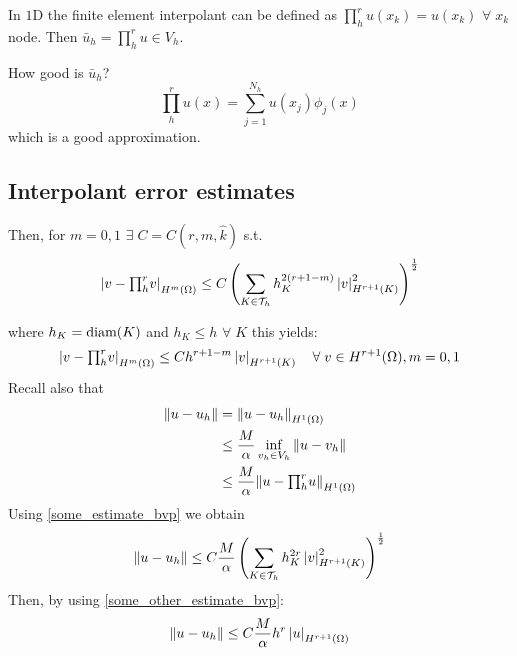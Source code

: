 In \(1\)D the finite element interpolant can be defined as \(\prod_{h}^{r} u(x_k) = u(x_k)\) \(\forall \; x_k\) node. Then \(\bar{u}_h = \prod_{h}^r u \in V_h\). 

How good is \(\bar{u}_h\)? 
\[
    \prod_{h}^{r} u(x) = \sum_{j=1}^{N_h} u(x_j)\phi_j(x)
\]
which is a good approximation.
\subsection*{Interpolant error estimates}
Then, for \(m=0,1\) \(\exists \; C = C(r,m,\hat{k})\) s.t.
\begin{equation}
    \left\lvert v-{\textstyle\prod_{h}^{r}}v\right\rvert_{H^m(\Omega)} \leq C\left(\sum_{K \in \mathcal{T}_h}h_K^{2(r+1-m)}\left\lvert v\right\rvert_{H^{r+1}(K)}^2\right)^{\frac{1}{2}} \label{some_estimate_bvp}
\end{equation}
    

where \(h_K = \text{diam}(K)\) and \(h_K \leq h\) \(\forall \; K\) this yields:
\begin{equation}
    \left\lvert v-{\textstyle\prod_{h}^{r}}v\right\rvert_{H^m(\Omega)} \leq C h^{r+1-m}\left\lvert v\right\rvert_{H^{r+1}(K)} \quad \forall \; v \in H^{r+1}(\Omega), m = 0,1 \label{some_other_estimate_bvp}
\end{equation}
Recall also that 
\begin{align*}
    \norm{u-u_h} &= \norm{u-u_h}_{H^1(\Omega)} \\
    &\leq \frac{M}{\alpha} \inf_{v_h \in V_h} \norm{u-v_h} \\
    &\leq \frac{M}{\alpha} \norm{u-{\textstyle\prod_{h}^{r}} u}_{H^1(\Omega)}
\end{align*}
Using \eqref{some_estimate_bvp} we obtain
\begin{equation}
    \norm{u-u_h} \leq C\frac{M}{\alpha}\left(\sum_{K \in \mathcal{T}_h}h_K^{2r}\left\lvert v\right\rvert_{H^{r+1}(K)}^2\right)^{\frac{1}{2}} \label{first_estimate_H1_bvp}
\end{equation}
Then, by using \eqref{some_other_estimate_bvp}:
\begin{equation}
    \norm{u-u_h} \leq C \frac{M}{\alpha} h^r \left\lvert u\right\rvert_{H^{r+1}(\Omega)} \label{second_estimate_H1_bvp}
\end{equation}

